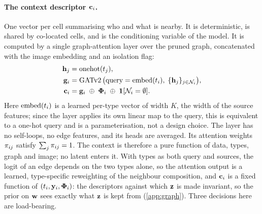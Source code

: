 \paragraph{The context descriptor $\mathbf{c}_i$.}
One vector per cell summarising who and what is nearby. It is deterministic, is shared by co-located cells, and is the conditioning variable of the model. It is computed by a single graph-attention layer \citep{brody2022} over the pruned graph, concatenated with the image embedding and an isolation flag:
\begin{align}
  \mathbf{h}_j &= \operatorname{onehot}(t_j), \label{eq:context-src}\\
  \mathbf{g}_i &= \operatorname{GATv2}\big(\text{query} = \operatorname{embed}(t_i),\; \{\mathbf{h}_j\}_{j \in \mathcal{N}_{i}}\big), \label{eq:context-gat}\\
  \mathbf{c}_i &= \mathbf{g}_i \;\oplus\; \boldsymbol{\Phi}_i \;\oplus\; \mathbf{1}[\mathcal{N}_{i} = \emptyset]. \label{eq:context}
\end{align}
Here $\operatorname{embed}(t_i)$ is a learned per-type vector of width $K$, the width of the source features; since the layer applies its own linear map to the query, this is equivalent to a one-hot query and is a parameterisation, not a design choice. The layer has no self-loops, no edge features, and its heads are averaged. Its attention weights $\pi_{ij}$ satisfy $\sum_j \pi_{ij} = 1$. The context is therefore a pure function of data, types, graph and image; no latent enters it. With types as both query and sources, the logit of an edge depends on the two types alone, so the attention output is a learned, type-specific reweighting of the neighbour composition, and $\mathbf{c}_i$ is a fixed function of $(t_i, \mathbf{y}_i, \boldsymbol{\Phi}_i)$: the descriptors against which $\mathbf{z}$ is made invariant, so the prior on $\mathbf{w}$ sees exactly what $\mathbf{z}$ is kept from (\cref{app:graph}). Three decisions here are load-bearing.

